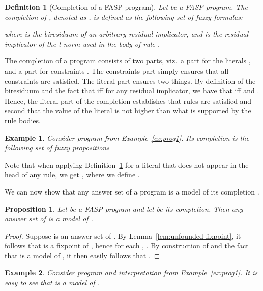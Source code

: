 \documentclass{tlp}
\newtheorem{definition}{Definition}
\newtheorem{example}{Example}
\newtheorem{proposition}{Proposition}
\begin{document}
\begin{definition}[Completion of a FASP program]\label{def:kcompletion}
 Let  be a FASP program. The completion of , denoted as , is defined as the following set of fuzzy formulas:

where  is the biresiduum of an arbitrary residual implicator, and  is the residual implicator of the t-norm used in the body of rule .
\end{definition}

The completion of a program consists of two parts, viz.~a part for the literals , and a part for constraints . The constraints part simply ensures that all constraints are satisfied. The literal part ensures two things. By definition of the biresiduum and the fact that  iff  for any residual implicator, we have that  iff  and . Hence, the literal part of the completion establishes that rules are satisfied and second that the value of the literal is not higher than what is supported by the rule bodies.











\begin{example}\label{ex:prog1-completion}
 Consider program  from Example~\ref{ex:prog1}. Its completion is the following set of fuzzy propositions
 
\end{example}

Note that when applying Definition~\ref{def:kcompletion} for a literal  that does not appear in the head of any rule, we get , where we define .

We can now show that any answer set of a program  is a model of its completion .



\begin{proposition}\label{prop:kansset-is-modelcomp}
 Let  be a FASP program and let  be its completion. Then any answer set of 
 is a model of .
\end{proposition}
\begin{proof}
 Suppose  is an answer set of . By Lemma~\ref{lem:unfounded-fixpoint}, it follows that  is a fixpoint of , hence for each , . By construction of  and the fact that  is a model of , it then easily follows that .
\end{proof}

\begin{example}
Consider program  and interpretation  from Example~\ref{ex:prog1}. It is easy to see that  is a model of .
\end{example}
\end{document}
